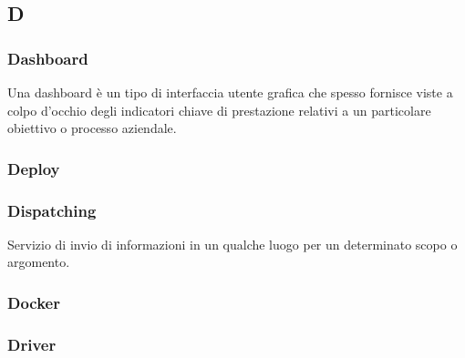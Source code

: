 \subsection*{\textbf{\hfill \Huge{D} \hfill}} 
\subsubsection*{Dashboard}
Una dashboard è un tipo di interfaccia utente grafica che spesso fornisce viste a colpo d’occhio degli indicatori chiave di prestazione relativi a un particolare obiettivo o processo aziendale.
\subsubsection*{Deploy}

\subsubsection*{Dispatching}
Servizio di invio di informazioni in un qualche luogo per un determinato scopo o argomento.
\subsubsection*{Docker}

\subsubsection*{Driver}

